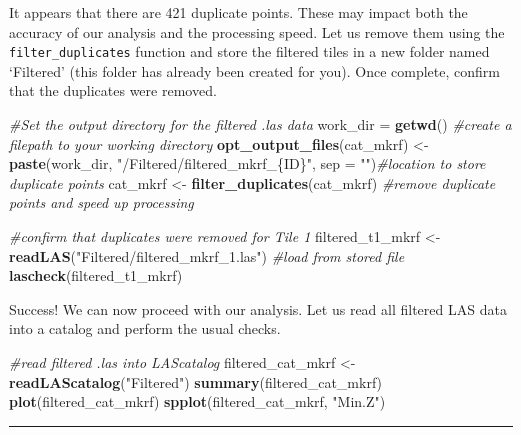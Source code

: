 \documentclass[
]{book}
\newenvironment{Shaded}{\begin{snugshade}}{\end{snugshade}}
\newcommand{\AttributeTok}[1]{\textcolor[rgb]{0.13,0.29,0.53}{#1}}
\newcommand{\CommentTok}[1]{\textcolor[rgb]{0.56,0.35,0.01}{\textit{#1}}}
\newcommand{\FunctionTok}[1]{\textcolor[rgb]{0.13,0.29,0.53}{\textbf{#1}}}
\newcommand{\NormalTok}[1]{#1}
\newcommand{\OtherTok}[1]{\textcolor[rgb]{0.56,0.35,0.01}{#1}}
\newcommand{\StringTok}[1]{\textcolor[rgb]{0.31,0.60,0.02}{#1}}
\begin{document}
It appears that there are 421 duplicate points. These may impact both the accuracy of our analysis and the processing speed. Let us remove them using the \texttt{filter\_duplicates} function and store the filtered tiles in a new folder named `Filtered' (this folder has already been created for you). Once complete, confirm that the duplicates were removed.

\begin{Shaded}
\begin{Highlighting}[]
\CommentTok{\#Set the output directory for the filtered .las data}
\NormalTok{work\_dir }\OtherTok{=} \FunctionTok{getwd}\NormalTok{() }\CommentTok{\#create a filepath to your working directory}
\FunctionTok{opt\_output\_files}\NormalTok{(cat\_mkrf) }\OtherTok{\textless{}{-}} \FunctionTok{paste}\NormalTok{(work\_dir, }\StringTok{"/Filtered/filtered\_mkrf\_\{ID\}"}\NormalTok{, }\AttributeTok{sep =} \StringTok{""}\NormalTok{)}\CommentTok{\#location to store duplicate points}
\NormalTok{cat\_mkrf }\OtherTok{\textless{}{-}} \FunctionTok{filter\_duplicates}\NormalTok{(cat\_mkrf) }\CommentTok{\#remove duplicate points and speed up processing}

\CommentTok{\#confirm that duplicates were removed for Tile 1}
\NormalTok{filtered\_t1\_mkrf }\OtherTok{\textless{}{-}} \FunctionTok{readLAS}\NormalTok{(}\StringTok{"Filtered/filtered\_mkrf\_1.las"}\NormalTok{) }\CommentTok{\#load from stored file}
\FunctionTok{lascheck}\NormalTok{(filtered\_t1\_mkrf)}
\end{Highlighting}
\end{Shaded}

Success! We can now proceed with our analysis. Let us read all filtered LAS data into a catalog and perform the usual checks.

\begin{Shaded}
\begin{Highlighting}[]
\CommentTok{\#read filtered .las into LAScatalog}
\NormalTok{filtered\_cat\_mkrf }\OtherTok{\textless{}{-}} \FunctionTok{readLAScatalog}\NormalTok{(}\StringTok{"Filtered"}\NormalTok{)}
\FunctionTok{summary}\NormalTok{(filtered\_cat\_mkrf)}
\FunctionTok{plot}\NormalTok{(filtered\_cat\_mkrf)}
\FunctionTok{spplot}\NormalTok{(filtered\_cat\_mkrf, }\StringTok{"Min.Z"}\NormalTok{)}
\end{Highlighting}
\end{Shaded}

\begin{center}\rule{0.5\linewidth}{0.5pt}\end{center}
\end{document}
